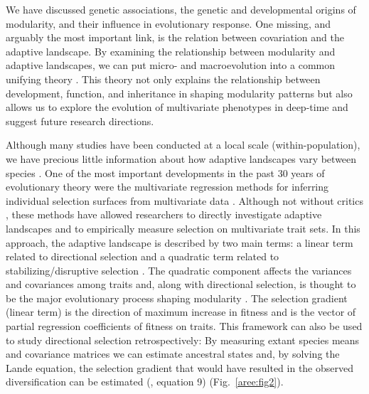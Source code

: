 \begin{refsection}
We have discussed genetic associations, the genetic and developmental
origins of modularity, and their influence in evolutionary response. One
missing, and arguably the most important link, is the relation between
covariation and the adaptive landscape. By examining the relationship
between modularity and adaptive landscapes, we can put micro- and
macroevolution into a common unifying theory \parencite{Arnold2001-lz, Arnold2014-gd}. 
This theory not
only explains the relationship between development, function, and
inheritance in shaping modularity patterns but also allows us to explore
the evolution of multivariate phenotypes in deep-time and suggest future
research directions.

Although many studies have been conducted at a local scale
(within-population), we have precious little information about how
adaptive landscapes vary between species \parencite{Pfaender2016-eb}. One of the
most important developments in the past 30 years of evolutionary theory
were the multivariate regression methods for inferring individual
selection surfaces from multivariate data \parencite{Lande1983-ez}. 
Although not
without critics \parencite{Shaw2010-wg},
these methods have allowed researchers to directly investigate adaptive
landscapes and to empirically measure selection on multivariate trait
sets. In this approach, the adaptive landscape is described by two main
terms: a linear term related to directional selection and a quadratic
term related to stabilizing/disruptive selection \parencite{Lande1983-ez}. 
The quadratic
component affects the variances and covariances among traits and, along
with directional selection, is thought to be the major evolutionary
process shaping modularity \parencite{Melo2015-bk}. The selection gradient (linear term) is the direction
of maximum increase in fitness and is the vector of partial regression
coefficients of fitness on traits. This framework can also be used to
study directional selection retrospectively: By measuring extant species
means and covariance matrices we can estimate ancestral states and, by
solving the Lande equation, the selection gradient that would have
resulted in the observed diversification can be estimated
(\textcite{Lande1979-by}, equation 9)
(Fig.~\ref{aree:fig2}).


\end{refsection}
